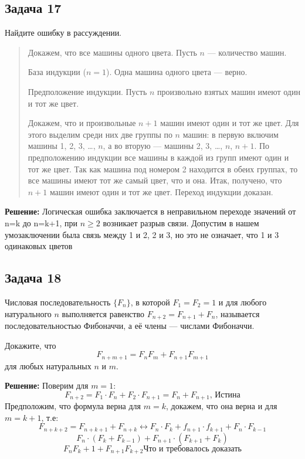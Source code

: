\documentclass[a4paper,12pt]{article}
\begin{document}
\subsection{Задача 17}
Найдите ошибку в рассуждении.
\begin{quote}
Докажем, что все машины одного цвета. Пусть \(n\) — количество машин.

База индукции (\(n = 1\)). Одна машина одного цвета — верно.

Предположение индукции. Пусть \(n\) произвольно взятых машин имеют один и тот же цвет.

Докажем, что и произвольные \(n + 1\) машин имеют один и тот же цвет. Для этого выделим среди них две группы по \(n\) машин: в первую включим машины 1, 2, 3, \ldots, \(n\), а во вторую — машины 2, 3, \ldots, \(n\), \(n + 1\). По предположению индукции все машины в каждой из групп имеют один и тот же цвет. Так как машина под номером 2 находится в обеих группах, то все машины имеют тот же самый цвет, что и она. Итак, получено, что \(n+1\) машин имеют один и тот же цвет. Переход индукции доказан.
\end{quote}

\textbf{Решение:}
Логическая ошибка заключается в неправильном переходе значений от n=k до n=k+1, при $n\ge 2$ возникает разрыв связи. Допустим в нашем умозаключении была связь между 1 и 2, 2 и 3, но это не означает, что 1 и 3 одинаковых цветов
\vspace{1cm}

\subsection{Задача 18}
Числовая последовательность \(\{F_n\}\), в которой \(F_1 = F_2 = 1\) и для любого натурального \(n\) выполняется равенство \(F_{n+2} = F_{n+1} + F_n\), называется последовательностью Фибоначчи, а её члены — числами Фибоначчи.

Докажите, что
\[
F_{n+m+1} = F_n F_m + F_{n+1} F_{m+1}
\]
для любых натуральных \(n\) и \(m\).

\textbf{Решение:}
Поверим  для $m=1$:
\[
F_{n+2}=F_1\cdot F_n + F_2\cdot F_{n+1} = F_n + F_{n+1} \text{, Истина}
\]
Предположим, что формула верна для $m=k$, докажем, что она верна и для $m=k+1$, т.е:
\[
F_{n+k+2} = F_{n+k+1} + F_{n+k} \leftrightarrow F_{n}\cdot F_{k} + f_{n+1}\cdot f_{k+1} + F_n\cdot F_{k-1}
\]
\[
F_{n}\cdot (F_k+F_{k-1}) + F_{n+1}\cdot (F_{k+1}+F_k)
\]
\[
F_{n}F_k+1 + F_{n+1}F_{k+2}\text{Что и требовалось доказать}
\]
\vspace{1cm}
\end{document}
